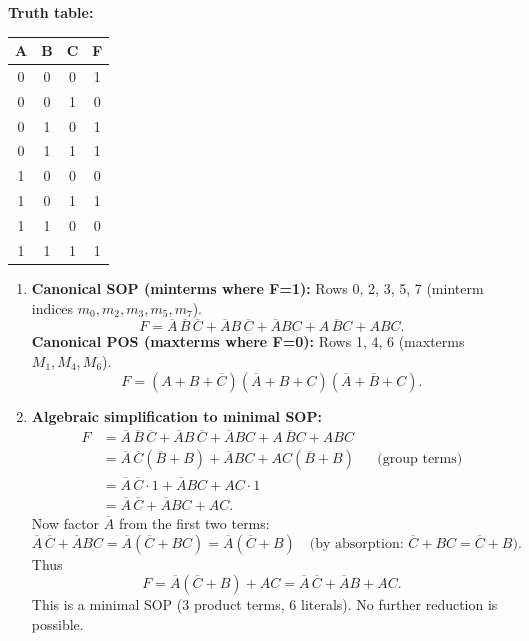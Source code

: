 \documentclass[11pt]{article}
\begin{document}
\begin{corrige}
\textbf{Truth table:}
\begin{center}
\begin{tabular}{|c|c|c|c|}
\hline
A & B & C & F \\
\hline
0 & 0 & 0 & 1 \\
0 & 0 & 1 & 0 \\
0 & 1 & 0 & 1 \\
0 & 1 & 1 & 1 \\
1 & 0 & 0 & 0 \\
1 & 0 & 1 & 1 \\
1 & 1 & 0 & 0 \\
1 & 1 & 1 & 1 \\
\hline
\end{tabular}
\end{center}

\begin{enumerate}
\item \textbf{Canonical SOP (minterms where F=1):} Rows 0, 2, 3, 5, 7 (minterm indices \(m_0, m_2, m_3, m_5, m_7\)).
\[
F = \overline{A}\,\overline{B}\,\overline{C} + \overline{A}B\,\overline{C} + \overline{A}BC + A\,\overline{B}C + ABC.
\]
\textbf{Canonical POS (maxterms where F=0):} Rows 1, 4, 6 (maxterms \(M_1, M_4, M_6\)).
\[
F = (A + B + \overline{C})(\overline{A} + B + C)(\overline{A} + \overline{B} + C).
\]

\item \textbf{Algebraic simplification to minimal SOP:}
\[
\begin{aligned}
F &= \overline{A}\,\overline{B}\,\overline{C} + \overline{A}B\,\overline{C} + \overline{A}BC + A\,\overline{B}C + ABC \\
&= \overline{A}\,\overline{C}(\overline{B} + B) + \overline{A}BC + AC(\overline{B} + B) && \text{(group terms)} \\
&= \overline{A}\,\overline{C} \cdot 1 + \overline{A}BC + AC \cdot 1 \\
&= \overline{A}\,\overline{C} + \overline{A}BC + AC.
\end{aligned}
\]
Now factor \(\overline{A}\) from the first two terms:
\[
\overline{A}\,\overline{C} + \overline{A}BC = \overline{A}(\overline{C} + BC) = \overline{A}(\overline{C} + B) \quad \text{(by absorption: } \overline{C} + BC = \overline{C} + B\text{)}.
\]
Thus
\[
F = \overline{A}(\overline{C} + B) + AC = \overline{A}\,\overline{C} + \overline{A}B + AC.
\]
This is a minimal SOP (3 product terms, 6 literals). No further reduction is possible.
\end{enumerate}
\end{corrige}
\end{document}

